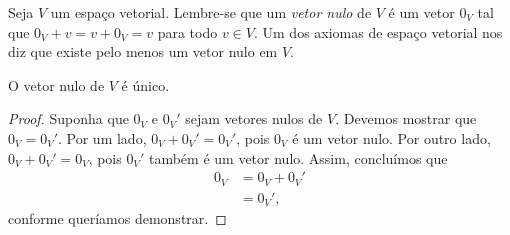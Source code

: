 Seja $V$ um espaço vetorial. Lembre-se que um \emph{vetor nulo} de $V$ é um vetor $0_V$ tal que $0_V+v=v+0_V=v$ para todo $v\in V$. Um dos axiomas de espaço vetorial nos diz que existe pelo menos um vetor nulo em $V$.

\begin{theorem}
	O vetor nulo de $V$ é único.
\end{theorem}
\begin{proof}
	Suponha que $0_V$ e $0_V'$ sejam vetores nulos de $V$. Devemos mostrar que $0_V=0_V'$. Por um lado, $0_V+0_V'=0_V'$, pois $0_V$ é um vetor nulo. Por outro lado, $0_V+0_V'=0_V$, pois $0_V'$ também é um vetor nulo. Assim, concluímos que
	\begin{align*}
		0_V
			&=0_V+0_V'\\
			&=0_V',
	\end{align*}
	conforme queríamos demonstrar. 
\end{proof}